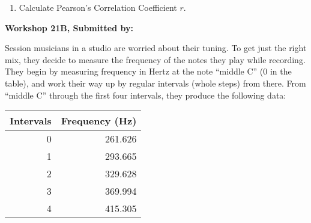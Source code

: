 \documentclass[11pt]{book}\usepackage[]{graphicx}\usepackage[]{color}
\begin{document}
\begin{exercises}
\begin{exercise}
\begin{enumerate}
  \item	Calculate Pearson’s Correlation Coefficient $r$.
\end{enumerate}

\end{exercise}
\begin{solution}  %

\end{solution}


\clearpage

    \begin{exercise}  %

    \begin{center}
\begin{flushleft}\textbf{\large \hfill Workshop 21B, Submitted by: }\end{flushleft}

\end{center}

Session musicians in a studio are worried about their tuning. To get just the right mix, they decide to measure the frequency of the notes they play while recording. They begin by measuring frequency in Hertz at the note ``middle C'' (0 in the table), and work their way up by regular intervals (whole steps) from there.  From ``middle C'' through the first four intervals, they produce the following data:

\begin{center}
\begin{tabular}{@{} rr @{}} \hline
Intervals	& Frequency (Hz) \\ \hline
0 &	261.626 \\
1 &	293.665 \\
2 &	329.628 \\
3	& 369.994 \\
4	& 415.305 \\ \hline
\end{tabular}
\end{center}


\end{exercise}
\end{exercises}
\end{document}
